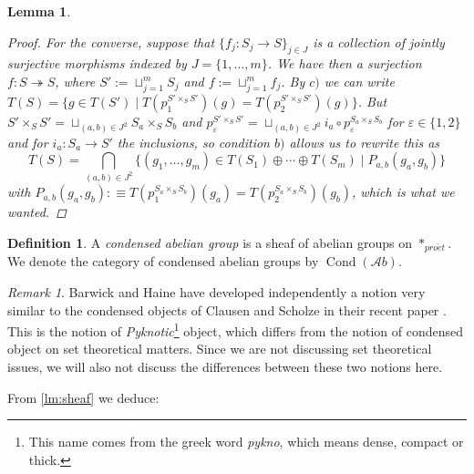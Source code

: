 \documentclass[11pt,A4]{article}
\theoremstyle{plain}
\newtheorem{lm}[thm]{Lemma}
\theoremstyle{definition}
\newtheorem{defn}[thm]{Definition}
\theoremstyle{remark}
\newtheorem{rem}[thm]{Remark}
\newcommand{\1}{\mathbbm{1}}
\newcommand{\Ab}{\mathscr{A}b}
\DeclareMathOperator{\Cond}{Cond}
\newcommand{\pe}{*_{pro\acute et}}
\newcommand{\op}{\oplus}
\newcommand{\fp}[1]{\times_{#1}}
\begin{document}
\begin{lm}
\begin{proof}
	For the converse, suppose that $\{f_{j}\colon S_{j}\to S\}_{j\in J}$ is a collection of jointly surjective morphisms indexed by $J=\{ 1,\ldots,m\}$.
	We have then a surjection $f\colon S \twoheadrightarrow S$, where $S':=\sqcup_{j=1}^{m}S_{j}$ and $f:=\sqcup_{j=1}^{m}f_{j}$.
	By $c)$ we can write $T(S)=\{ g\in T(S')\mid T(p_{1}^{S'\fp{S}S'})(g)=T(p_{2}^{S'\fp{S}S'})(g)\}$.
	But $S'\fp{S}S'=\sqcup_{(a,b)\in J^{2}} S_{a}\fp{S}S_{b}$ and $p_{\varepsilon }^{S'\fp{S}S'}=\sqcup_{(a,b)\in J^{2}} i_{a}\circ p_{\varepsilon }^{S_{a}\fp{S}S_{b}}$ for $\varepsilon \in \{1,2\}$ and for $i_{a}\colon S_{a}\to S'$ the inclusions, so condition $b)$ allows us to rewrite this as
	\[ T(S)=\bigcap_{(a,b)\in J^{2}} \{ (g_{1},\ldots,g_{m})\in T(S_{1})\op \cdots \op T(S_{m})\mid P_{a,b}(g_{a},g_{b})\}\]
	with $P_{a,b}(g_{a},g_{b}):\equiv T(p_{1}^{S_{a}\fp{S}S_{b}})(g_{a})=T(p_{2}^{S_{a}\fp{S}S_{b}})(g_{b})$, which is what we wanted.	
    \end{proof}
\end{lm}

\begin{defn}
    A \textit{condensed abelian group} is a sheaf of abelian groups on $\pe$.
    We denote the category of condensed abelian groups by $\Cond(\Ab)$.
\end{defn}

\begin{rem}
    Barwick and Haine have developed independently a notion very similar to the condensed objects of Clausen and Scholze in their recent paper \cite{bh19}.
    This is the notion of \textit{Pyknotic}\footnote{This name comes from the greek word \textit{pykno}, which means dense, compact or thick.} object, which differs from the notion of condensed object on set theoretical matters.
    Since we are not discussing set theoretical issues, we will also not discuss the differences between these two notions here.
\end{rem}

From \cref{lm:sheaf} we deduce:
\end{document}
